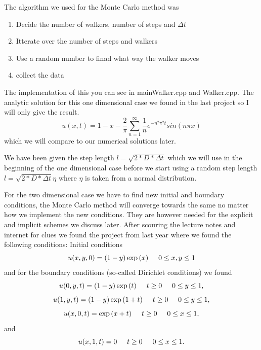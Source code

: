 \documentclass[a4wide,12pt]{article}
\begin{document}
The algorithm we used for the Monte Carlo method was 
\begin{enumerate}
\item{Decide the number of walkers, number of steps and $\Delta t$}
\item{Itterate over the number of steps and walkers}
\item{Use a random number to finad what way the walker moves}
\item{collect the data}
\end{enumerate}

\begin{algorithm}[H]
\SetAlgoLined
{}
\end{algorithm}
The implementation of this you can see in mainWalker.cpp and Walker.cpp. The analytic solution for this one dimensional case we found in the last project so I will only give the result.
\[
u(x,t) = 1 - x - \frac{2}{\pi}\sum\limits_{n=1}^{\infty} \frac{1}{n} e^{-n^{2}\pi^{2}t} sin(n\pi x)
\]
which we will compare to our numerical solutions later. 

We have been given the step length $l = \sqrt{2*D*\Delta t}$ which we will use in the beginning of the one dimensional case
before we start using a random step length $l = \sqrt{2*D*\Delta t}\eta$ where $\eta$ is taken from a normal distribution.


For the two dimensional case we have to find new initial and boundary conditions, the Monte Carlo method will converge towards the same no matter how we
implement the new conditions. They are however needed for the explicit and implicit schemes we discuss later. 
After scouring the lecture notes and internet for clues we found the project from last year where we found the following conditions:
Initial conditions
\[
u(x,y,0)=(1-y)\exp{(x)}  \hspace{0.5cm} 0 \le x, y \le 1
\]
and for the boundary conditions (so-called Dirichlet conditions) we found
\[
u(0,y,t)= (1-y)\exp{(t)} \hspace{0.5cm} t \ge 0 \hspace{0.5cm} 0\le y \le 1,
\]
\[
u(1,y,t)= (1-y)\exp{(1+t)} \hspace{0.5cm} t \ge 0 \hspace{0.5cm} 0\le y \le 1,
\]
\[
u(x,0,t)= \exp{(x+t)} \hspace{0.5cm} t \ge 0 \hspace{0.5cm} 0\le x \le 1,
\]
and
\[
u(x,1,t)= 0 \hspace{0.5cm} t \ge 0 \hspace{0.5cm} 0\le x \le 1.
\]
\end{document}
